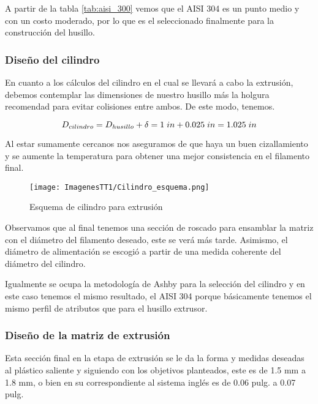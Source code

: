 \documentclass[14pt,oneside]{extarticle} %
\begin{document}
A partir de la tabla \ref{tab:aisi_300} vemos que el AISI 304 es un punto medio y con un costo moderado, por lo que es el seleccionado finalmente para la construcción del husillo.


\subsubsection{Diseño del cilindro}
En cuanto a los cálculos del cilindro en el cual se llevará a cabo la extrusión, debemos contemplar las dimensiones de nuestro husillo más la holgura recomendad para evitar colisiones entre ambos. De este modo, tenemos.

\begin{equation*}
    D_{cilindro}=D_{husillo}+\delta=1\hspace{0.1cm}in+0.025\hspace{0.1cm}in=1.025\hspace{0.1cm}in
\end{equation*}

Al estar sumamente cercanos nos aseguramos de que haya un buen cizallamiento y se aumente la
temperatura para obtener una mejor consistencia en el filamento final.

\begin{figure}[H]
    \centering
    \texttt{[image: ImagenesTT1/Cilindro\_esquema.png]}
    \caption{Esquema de cilindro para extrusión}
    \label{fig:Cilindro_esquema}
\end{figure}

Observamos que al final tenemos una sección de roscado para ensamblar la matriz con el diámetro del filamento deseado, este se verá más tarde. Asimismo, el diámetro de alimentación se escogió a partir de una medida coherente del diámetro del cilindro.

Igualmente se ocupa la metodología de Ashby para la selección del cilindro y en este caso tenemos el mismo resultado, el AISI 304 porque básicamente tenemos el mismo perfil de atributos que para el husillo extrusor.


\subsubsection{Diseño de la matriz de extrusión}

Esta sección final en la etapa de extrusión se le da la forma y medidas deseadas al plástico saliente y siguiendo con los objetivos planteados, este es de 1.5 mm a 1.8 mm, o bien en su correspondiente al sistema inglés es de 0.06 pulg. a 0.07 pulg.
\end{document}
